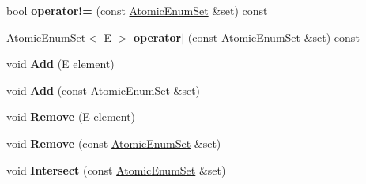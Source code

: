 \begin{DoxyCompactItemize}
\item 
bool {\bfseries operator!=} (const \hyperlink{classv8_1_1internal_1_1_atomic_enum_set}{Atomic\+Enum\+Set} \&set) const \hypertarget{classv8_1_1internal_1_1_atomic_enum_set_afaf4322c5c0baeaf69182fa55bb4c157}{}\label{classv8_1_1internal_1_1_atomic_enum_set_afaf4322c5c0baeaf69182fa55bb4c157}

\item 
\hyperlink{classv8_1_1internal_1_1_atomic_enum_set}{Atomic\+Enum\+Set}$<$ E $>$ {\bfseries operator$\vert$} (const \hyperlink{classv8_1_1internal_1_1_atomic_enum_set}{Atomic\+Enum\+Set} \&set) const \hypertarget{classv8_1_1internal_1_1_atomic_enum_set_afd8bf6ddf59befa70a01cf94bcac0b8c}{}\label{classv8_1_1internal_1_1_atomic_enum_set_afd8bf6ddf59befa70a01cf94bcac0b8c}

\item 
void {\bfseries Add} (E element)\hypertarget{classv8_1_1internal_1_1_atomic_enum_set_a926b772a802ecdcb8e486b615a13e107}{}\label{classv8_1_1internal_1_1_atomic_enum_set_a926b772a802ecdcb8e486b615a13e107}

\item 
void {\bfseries Add} (const \hyperlink{classv8_1_1internal_1_1_atomic_enum_set}{Atomic\+Enum\+Set} \&set)\hypertarget{classv8_1_1internal_1_1_atomic_enum_set_af38efb6b46817d0e115bd7a05c4e9975}{}\label{classv8_1_1internal_1_1_atomic_enum_set_af38efb6b46817d0e115bd7a05c4e9975}

\item 
void {\bfseries Remove} (E element)\hypertarget{classv8_1_1internal_1_1_atomic_enum_set_ab6fb0550255463a8a68bde84a6515bef}{}\label{classv8_1_1internal_1_1_atomic_enum_set_ab6fb0550255463a8a68bde84a6515bef}

\item 
void {\bfseries Remove} (const \hyperlink{classv8_1_1internal_1_1_atomic_enum_set}{Atomic\+Enum\+Set} \&set)\hypertarget{classv8_1_1internal_1_1_atomic_enum_set_af50b087a2bae99c5cbf552531520e98d}{}\label{classv8_1_1internal_1_1_atomic_enum_set_af50b087a2bae99c5cbf552531520e98d}

\item 
void {\bfseries Intersect} (const \hyperlink{classv8_1_1internal_1_1_atomic_enum_set}{Atomic\+Enum\+Set} \&set)\hypertarget{classv8_1_1internal_1_1_atomic_enum_set_a9ba943f5b3455a92dcc47c51933daa1b}{}\label{classv8_1_1internal_1_1_atomic_enum_set_a9ba943f5b3455a92dcc47c51933daa1b}

\end{DoxyCompactItemize}
